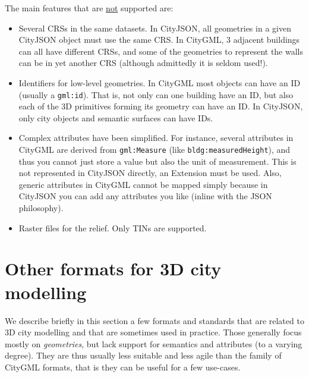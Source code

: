 The main features that are \underline{not} supported are:
\begin{itemize}
  \item Several CRSs in the same datasets. In CityJSON, all geometries in a given CityJSON object must use the same CRS\@. In CityGML, 3 adjacent buildings can all have different CRSs, and some of the geometries to represent the walls can be in yet another CRS (although admittedly it is seldom used!).
  \item Identifiers for low-level geometries. In CityGML most objects can have an ID (usually a \texttt{gml:id}). That is, not only can one building have an ID, but also each of the 3D primitives forming its geometry can have an ID\@. In CityJSON, only city objects and semantic surfaces can have IDs.
  \item Complex attributes have been simplified. For instance, several attributes in CityGML are derived from \texttt{gml:Measure} (like \texttt{bldg:mea\-su\-red\-Height}), and thus you cannot just store a value but also the unit of measurement. This is not represented in CityJSON directly, an Extension must be used. Also, generic attributes in CityGML cannot be mapped simply because in CityJSON you can add any attributes you like (inline with the JSON philosophy).
  \item Raster files for the relief. Only TINs are supported.
\end{itemize}



%
\section[Other formats]{Other formats for 3D city modelling}

We describe briefly in this section a few formats and standards that are related to 3D city modelling and that are sometimes used in practice.
Those generally focus mostly on \emph{geometries}, but lack support for semantics and attributes (to a varying degree).
They are thus usually less suitable and less agile than the family of CityGML formats, that is they can be useful for a few use-cases.



